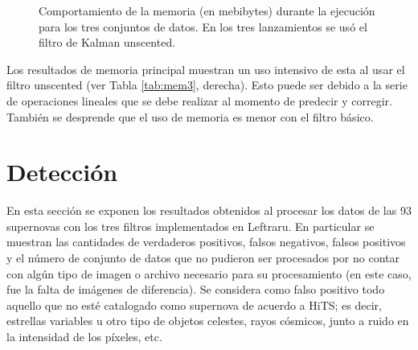 \begin{figure}[h!]
\centering
{}\hfill
{}\vfill
{}
\caption{Comportamiento de la memoria (en mebibytes) durante la ejecuci\'on para los tres conjuntos de datos. En los tres lanzamientos se us\'o el filtro de Kalman unscented.}
\label{fig:mem_ukf}
\end{figure}



Los resultados de memoria principal muestran un uso intensivo de esta al usar el filtro unscented (ver Tabla \ref{tab:mem3}, derecha). Esto puede ser debido a la serie de operaciones lineales que se debe realizar al momento de predecir y corregir. Tambi\'en se desprende que el uso de memoria es menor con el filtro b\'asico.
\bigskip
 
\section{Detecci\'on}
En esta secci\'on se exponen los resultados obtenidos al procesar los datos de las 93 supernovas con los tres filtros implementados en Leftraru. En particular se muestran las cantidades de verdaderos positivos, falsos negativos, falsos positivos y el n\'umero de conjunto de datos que no pudieron ser procesados por no contar con alg\'un tipo de imagen o archivo necesario para su procesamiento (en este caso, fue la falta de im\'agenes de diferencia). Se considera como falso positivo todo aquello que no est\'e catalogado como supernova de acuerdo a HiTS; es decir, estrellas variables u otro tipo de objetos celestes, rayos c\'osmicos, junto a ruido en la intensidad de los p\'ixeles, etc.
\bigskip

